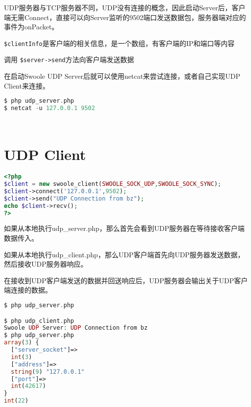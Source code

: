 UDP服务器与TCP服务器不同，UDP没有连接的概念，因此启动Server后，客户端无需Connect，直接可以向Server监听的9502端口发送数据包，服务器端对应的事件为onPacket。

\begin{compactitem}
\item \texttt{\$clientInfo}是客户端的相关信息，是一个数组，有客户端的IP和端口等内容
\item 调用 \texttt{\$server->send}方法向客户端发送数据
\end{compactitem}


在启动Swoole UDP Server后就可以使用netcat来尝试连接，或者自己实现UDP Client来连接。

\begin{lstlisting}[language=PHP]
$ php udp_server.php
$ netcat -u 127.0.0.1 9502
\end{lstlisting}




\begin{lstlisting}[language=PHP]

\end{lstlisting}






\begin{lstlisting}[language=PHP]

\end{lstlisting}


\section{UDP Client}


\begin{lstlisting}[language=PHP]
 <?php
$client = new swoole_client(SWOOLE_SOCK_UDP,SWOOLE_SOCK_SYNC);
$client->connect('127.0.0.1',9502);
$client->send("UDP Connection from bz");
echo $client->recv();
?>
\end{lstlisting}

\begin{compactitem}
\item 如果从本地执行udp\_server.php，那么首先会看到UDP服务器在等待接收客户端数据传入。
\item 如果从本地执行udp\_client.php，那么UDP客户端首先向UDP服务器发送数据，然后接收UDP服务器响应。
\item 在接收到UDP客户端发送的数据并回送响应后，UDP服务器会输出关于UDP客户端连接的数据。
\end{compactitem}


\begin{lstlisting}[language=PHP]
$ php udp_server.php

$ php udp_client.php
Swoole UDP Server: UDP Connection from bz
$ php udp_server.php
array(3) {
  ["server_socket"]=>
  int(3)
  ["address"]=>
  string(9) "127.0.0.1"
  ["port"]=>
  int(42617)
}
int(22)
\end{lstlisting}




